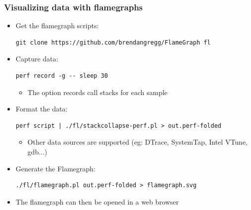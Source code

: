\begin{frame}[fragile]
  \frametitle{Visualizing data with flamegraphs}
  \begin{itemize}
    \item Get the flamegraph scripts:
  \begin{block}{}
    \begin{verbatim}
git clone https://github.com/brendangregg/FlameGraph fl
    \end{verbatim}
  \end{block}
    \item Capture data:
  \begin{block}{}
    \begin{verbatim}
perf record -g -- sleep 30
    \end{verbatim}
  \end{block}
      \begin{itemize}
        \item The  option records call stacks for each sample
      \end{itemize}
    \item Format the data:
      \begin{block}{}
        \begin{verbatim}
perf script | ./fl/stackcollapse-perf.pl > out.perf-folded
        \end{verbatim}
      \end{block}
      \begin{itemize}
        \item Other data sources are supported (eg: DTrace, SystemTap,
          Intel VTune, gdb...)
      \end{itemize}
    \item Generate the Flamegraph:
      \begin{block}{}
        \begin{verbatim}
./fl/flamegraph.pl out.perf-folded > flamegraph.svg
        \end{verbatim}
      \end{block}
    \item The flamegraph can then be opened in  a web browser
  \end{itemize}
\end{frame}

